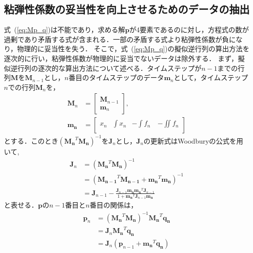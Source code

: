 \documentclass[a4paper]{jarticle}
\begin{document}
\subsection{粘弾性係数の妥当性を向上させるためのデータの抽出}\label{subsec:downsample}
式~(\ref{eq:Mp_q})は不能であり，求める解$\mathbf{p}$が4要素であるのに対し，方程式の数が過剰であり矛盾する式が含まれる．一部の矛盾する式より粘弾性係数が負になり，物理的に妥当性を失う．
そこで，式~(\ref{eq:Mp_q})の擬似逆行列の算出方法を逐次的に行い，粘弾性係数が物理的に妥当でないデータは除外する．
まず，擬似逆行列の逐次的な算出方法について述べる．タイムステップが$n-1$までの行列$\mathbf{M}$を$\mathbf{M}_{n-1}$とし，$n$番目のタイムステップのデータ$\mathbf{m}_n$として，タイムステップ$n$での行列$\mathbf{M}_n$を，
\begin{equation}
    \begin{aligned}
        \mathbf{M}_n &= \begin{bmatrix}
            \mathbf{M}_{n-1} \\
            \mathbf{m}_n
        \end{bmatrix},\\
        \mathbf{m_{n}}&=\begin{bmatrix}
            x_{n} & \int{x_{n}} & -\int{f_{n}}\ & -\iint{f_{n}}\\
        \end{bmatrix}
    \end{aligned}
\end{equation}
とする．このとき$(\mathbf{M_{n}}^{T}\mathbf{M_{n}})^{-1}$を$\mathbf{J}_{n}$とし，$\mathbf{J}_{n}$の更新式はWoodburyの公式を用いて,
\begin{equation}
    \begin{aligned}
    \mathbf{J}_n &= (\mathbf{M_{n}}^{T}\mathbf{M_{n}})^{-1}\\
                 &= (\mathbf{M_{n-1}}^{T}\mathbf{M_{n-1}} + \mathbf{m_{n}}^{T}\mathbf{m_{n}})^{-1}\\
                 &= \mathbf{J}_{n-1} - \frac{\mathbf{J}_{n-1}\mathbf{m_{n}}\mathbf{m_{n}}^{T}\mathbf{J}_{n-1}}{1+\mathbf{m_{n}}^{T}\mathbf{J}_{n-1}\mathbf{m_{n}}}
    \end{aligned}
    \label{eq:step_J}
\end{equation}
と表せる．$\mathbf{p}$の$n-1$番目と$n$番目の関係は，
\begin{equation}
    \begin{aligned}
    \mathbf{p}_n &= (\mathbf{M_{n}}^{T}\mathbf{M_{n}})^{-1}\mathbf{M_{n}}^{T}\mathbf{q_{n}}\\
                 &= \mathbf{J}_{n}\mathbf{M_{n}}^{T}\mathbf{q_{n}}\\
                 &= \mathbf{J}_{n}(\mathbf{p}_{n-1}+\mathbf{m_{n}}^{T}\mathbf{q_{n}})\\
    \end{aligned}
    \label{eq:step_p}
\end{equation}
\end{document}
